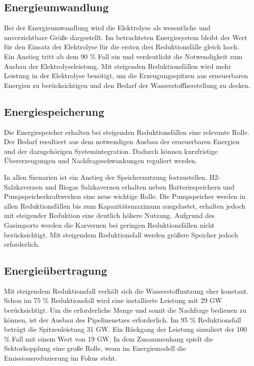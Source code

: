 \subsection{Energieumwandlung}
Bei der Energieumwandlung wird die Elektrolyse als wesentliche und unverzichtbare Größe dargestellt.  Im betrachteten Energiesystem bleibt der Wert für den Einsatz der Elektrolyse für die ersten drei Reduktionsfälle gleich hoch. Ein Anstieg tritt ab dem 90 \% Fall ein und verdeutlicht die Notwendigkeit zum Ausbau der Elektrolyseleistung. Mit steigenden Reduktionsfällen wird mehr Leistung in der Elektrolyse benötigt, um die Erzeugungsspitzen aus erneuerbaren Energien zu berücksichtigen und den Bedarf der Wasserstoffherstellung zu decken. 


\subsection{Energiespeicherung}
Die Energiespeicher erhalten bei steigenden Reduktionsfällen eine relevante Rolle. Der Bedarf resultiert aus dem notwendigen Ausbau der erneuerbaren Energien und der dazugehörigen Systemintegration. Dadurch können kurzfristige Übererzeugungen und Nachfrageschwankungen reguliert werden. 

In allen Szenarien ist ein Anstieg der Speichernutzung festzustellen. H2-Salzkavernen und Biogas Salzkavernen erhalten neben Batteriespeichern und Pumpspeicherkraftwerken eine neue wichtige Rolle. Die Pumpspeicher werden in allen Reduktionsfällen bis zum Kapazitätsmaximum ausgelastet, erhalten jedoch mit steigender Reduktion eine deutlich höhere Nutzung. Aufgrund des Gasimports werden die Karvernen bei geringen Reduktionsfällen nicht berücksichtigt. Mit steigendem Reduktionsfall werden größere Speicher jedoch erforderlich.

\subsection{Energieübertragung}
Mit steigendem Reduktionsfall verhält sich die Wasserstoffnutzung eher konstant. Schon im 75 \% Reduktionsfall wird eine installierte Leistung mit 29 GW berücksichtigt. Um die erforderliche Menge und somit die Nachfrage bedienen zu können, ist der Ausbau des Pipelinenetzes erforderlich. Im 95 \% Reduktionsfall beträgt die Spitzenleistung 31 GW. Ein Rückgang der Leistung simuliert der 100 \% Fall mit einem Wert von 19 GW. In dem Zusammenhang spielt die Sektorkopplung eine große Rolle, wenn im Energiemodell die Emissionsreduzierung im Fokus steht. 

